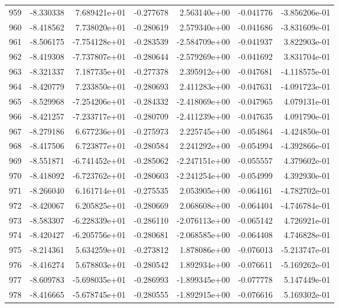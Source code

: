 \begin{tabular}{rrrrrrr}
 959 &  -8.330338 &  7.689421e+01 & -0.277678 &  2.563140e+00 &   -0.041776 & -3.856206e-01 \\
 960 &  -8.418562 &  7.738020e+01 & -0.280619 &  2.579340e+00 &   -0.041686 & -3.831609e-01 \\
 961 &  -8.506175 & -7.754128e+01 & -0.283539 & -2.584709e+00 &   -0.041937 &  3.822903e-01 \\
 962 &  -8.419308 & -7.737807e+01 & -0.280644 & -2.579269e+00 &   -0.041692 &  3.831704e-01 \\
 963 &  -8.321337 &  7.187735e+01 & -0.277378 &  2.395912e+00 &   -0.047681 & -4.118575e-01 \\
 964 &  -8.420779 &  7.233850e+01 & -0.280693 &  2.411283e+00 &   -0.047631 & -4.091723e-01 \\
 965 &  -8.529968 & -7.254206e+01 & -0.284332 & -2.418069e+00 &   -0.047965 &  4.079131e-01 \\
 966 &  -8.421257 & -7.233717e+01 & -0.280709 & -2.411239e+00 &   -0.047635 &  4.091790e-01 \\
 967 &  -8.279186 &  6.677236e+01 & -0.275973 &  2.225745e+00 &   -0.054864 & -4.424850e-01 \\
 968 &  -8.417506 &  6.723877e+01 & -0.280584 &  2.241292e+00 &   -0.054994 & -4.392866e-01 \\
 969 &  -8.551871 & -6.741452e+01 & -0.285062 & -2.247151e+00 &   -0.055557 &  4.379602e-01 \\
 970 &  -8.418092 & -6.723762e+01 & -0.280603 & -2.241254e+00 &   -0.054999 &  4.392930e-01 \\
 971 &  -8.266040 &  6.161714e+01 & -0.275535 &  2.053905e+00 &   -0.064161 & -4.782702e-01 \\
 972 &  -8.420067 &  6.205825e+01 & -0.280669 &  2.068608e+00 &   -0.064404 & -4.746784e-01 \\
 973 &  -8.583307 & -6.228339e+01 & -0.286110 & -2.076113e+00 &   -0.065142 &  4.726921e-01 \\
 974 &  -8.420427 & -6.205756e+01 & -0.280681 & -2.068585e+00 &   -0.064408 &  4.746828e-01 \\
 975 &  -8.214361 &  5.634259e+01 & -0.273812 &  1.878086e+00 &   -0.076013 & -5.213747e-01 \\
 976 &  -8.416274 &  5.678803e+01 & -0.280542 &  1.892934e+00 &   -0.076611 & -5.169262e-01 \\
 977 &  -8.609783 & -5.698035e+01 & -0.286993 & -1.899345e+00 &   -0.077778 &  5.147449e-01 \\
 978 &  -8.416665 & -5.678745e+01 & -0.280555 & -1.892915e+00 &   -0.076616 &  5.169302e-01 \\

\end{tabular}
